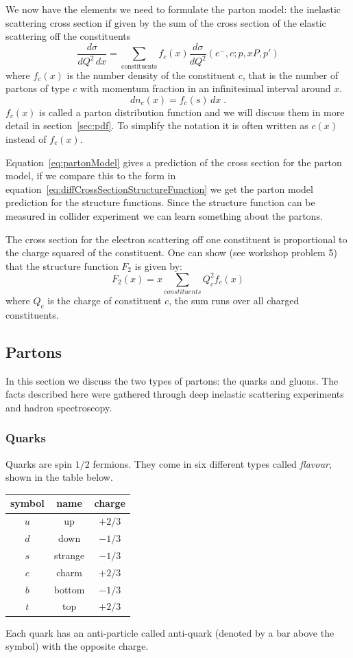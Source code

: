 \documentclass[12pt]{article}
\begin{document}
We now have the elements we need to formulate the parton model: the inelastic
scattering cross section if given by the sum of the cross section of the elastic scattering off the constituents
\begin{equation}\label{eq:partonModel}
\frac{d\sigma}{dQ^2\, dx}=\sum\limits_{\mbox{constituents}} f_c(x) \frac{d\sigma}{dQ^2}(e^-,c;p,xP,p') \end{equation}
where $f_c(x)$ is the number density of the constituent $c$, that is the number of partons of type $c$ with momentum fraction in an infinitesimal interval around $x$.
\[dn_c(x)=f_c(s)\,dx\;.\]
$f_c(x)$ is called a parton distribution function and we will discuss them in more detail in section~\ref{sec:pdf}. To simplify the notation it is often written as $c(x)$ instead of $f_c(x)$.

Equation~\ref{eq:partonModel} gives a prediction of the cross section for the parton model, if we compare this to the form in equation~\ref{eq:diffCrossSectionStructureFunction} we get the parton model prediction for the structure functions. Since the structure function can be measured in collider experiment we can learn something about the partons. 

The cross section for the electron scattering off one constituent is proportional to the charge squared of the constituent. One can show (see workshop problem 5) that the structure function $F_2$ is given by:
\[F_2(x)=x\sum\limits_{constituents}Q_c^2f_c(x)\]
where $Q_c$ is the charge of constituent $c$, the sum runs over all charged constituents. 

\subsection{Partons}
In this section we discuss the two types of partons: the quarks and gluons. The facts described here were gathered through deep inelastic scattering experiments and hadron spectroscopy. 
\subsubsection{Quarks}
Quarks are spin $1/2$ fermions. They come in six different types called \emph{flavour}, shown in the table below.
\begin{center}
\begin{tabular}{c|c|c}
symbol& name & charge \\\hline
$u$ & up & $+2/3$   \\
$d$ & down & $-1/3$  \\
$s$ & strange & $-1/3$ \\
$c$ & charm & $+2/3$ \\
$b$ & bottom & $-1/3$ \\
$t$ & top & $+2/3$
\end{tabular}
\end{center}
Each quark has an anti-particle called anti-quark (denoted by a bar above the symbol) with the opposite charge.
\end{document}
